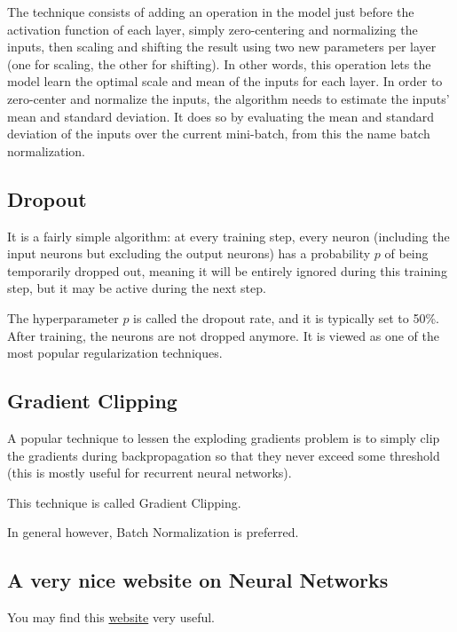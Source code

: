 \documentclass[%
oneside,                 %
final,                   %
10pt]{article}
\begin{document}
The technique consists of adding an operation in the model just before
the activation function of each layer, simply zero-centering and
normalizing the inputs, then scaling and shifting the result using two
new parameters per layer (one for scaling, the other for shifting). In
other words, this operation lets the model learn the optimal scale and
mean of the inputs for each layer.  In order to zero-center and
normalize the inputs, the algorithm needs to estimate the inputs’ mean
and standard deviation. It does so by evaluating the mean and standard
deviation of the inputs over the current mini-batch, from this the
name batch normalization.

\subsection{Dropout}

It is a fairly simple algorithm: at every training step, every neuron
(including the input neurons but excluding the output neurons) has a
probability $p$ of being temporarily dropped out, meaning it will be
entirely ignored during this training step, but it may be active
during the next step.

The hyperparameter $p$ is called the dropout rate, and it is typically
set to 50\%. After training, the neurons are not dropped anymore.  It
is viewed as one of the most popular regularization techniques.

\subsection{Gradient Clipping}

A popular technique to lessen the exploding gradients problem is to
simply clip the gradients during backpropagation so that they never
exceed some threshold (this is mostly useful for recurrent neural
networks).

This technique is called Gradient Clipping.

In general however, Batch
Normalization is preferred.

\subsection{A very nice website on Neural Networks}

You may find this \href{{https://playground.tensorflow.org/#activation=tanh&batchSize=10&dataset=circle&regDataset=reg-plane&learningRate=0.03&regularizationRate=0&noise=0&networkShape=4,2&seed=0.29243&showTestData=false&discretize=false&percTrainData=50&x=true&y=true&xTimesY=false&xSquared=false&ySquared=false&cosX=false&sinX=false&cosY=false&sinY=false&collectStats=false&problem=classification&initZero=false&hideText=false}}{website} very useful. 
\end{document}
